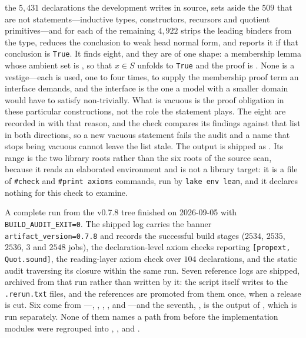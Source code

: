 \documentclass[11pt]{article}
\theoremstyle{definition}
\theoremstyle{remark}
\begin{document}
\begin{enumerate}[label=(\arabic*)]
the $5{,}431$ declarations the development writes in source, sets aside the $509$ that are not statements---inductive types, constructors, recursors and quotient primitives---and for each of the remaining $4{,}922$ strips the leading binders from the type, reduces the conclusion to weak head normal form, and reports it if that conclusion is \texttt{True}.  It finds eight, and they are of one shape: a membership lemma whose ambient set is , so that $x\in S$ unfolds to \texttt{True} and the proof is .  None is a vestige---each is used, one to four times, to supply the membership proof term an interface demands, and the interface is the one a model with a smaller domain would have to satisfy non-trivially.  What is vacuous is the proof obligation in these particular constructions, not the role the statement plays.  The eight are recorded in  with that reason, and the check compares its findings against that list in both directions, so a new vacuous statement fails the audit and a name that stops being vacuous cannot leave the list stale.  The output is shipped as .  Its range is the two library roots rather than the six roots of the source scan, because it reads an elaborated environment and  is not a library target: it is a file of \texttt{\#check} and \texttt{\#print axioms} commands, run by \texttt{lake env lean}, and it declares nothing for this check to examine.
\end{enumerate}

A complete  run from the v0.7.8 tree finished on 2026-09-05 with \texttt{BUILD\_AUDIT\_EXIT=0}.  The shipped log carries the banner \texttt{artifact\_version=0.7.8} and records the successful build stages ($2534$, $2535$, $2536$, $3$ and $2548$ jobs), the declaration-level axiom checks reporting \texttt{[propext, Quot.sound]}, the reading-layer axiom check over $104$ declarations, and the static audit traversing its closure within the same run.  Seven reference logs are shipped, archived from that run rather than written by it: the script itself writes to the \texttt{.rerun.txt} files, and the references are promoted from them once, when a release is cut.  Six come from ---, , , ,  and ---and the seventh, , is the output of , which is run separately.  None of them names a path from before the implementation modules were regrouped into , ,  and .
\end{document}
